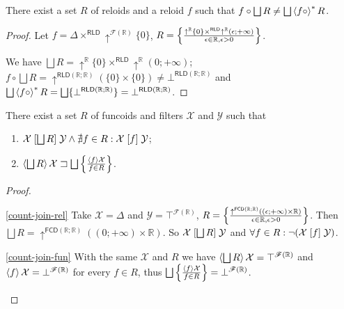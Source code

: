 \begin{example}
There exist a set $R$ of reloids and a reloid $f$ such that $f\circ\bigsqcup R\neq\bigsqcup\left\langle f\circ\right\rangle ^{\ast}R$.\end{example}
\begin{proof}
Let $f=\Delta\times^{\mathsf{RLD}}\uparrow^{\mathscr{F}(\mathbb{R})}\{0\}$,
$R=\left\{ \frac{\uparrow^{\mathbb{R}}\{0\}\times^{\mathsf{RLD}}\uparrow^{\mathbb{R}}(\epsilon;+\infty)}{\epsilon\in\mathbb{R},\epsilon>0}\right\}$.

We have $\bigsqcup R=\uparrow^{\mathbb{R}}\{0\}\times^{\mathsf{RLD}}\uparrow^{\mathbb{R}}(0;+\infty)$;
$f\circ\bigsqcup R=\uparrow^{\mathsf{RLD}(\mathbb{R};\mathbb{R})}(\{0\}\times\{0\})\ne\bot^{\mathsf{RLD}(\mathbb{R};\mathbb{R})}$
and $\bigsqcup\left\langle f\circ\right\rangle ^{\ast}R=\bigsqcup\{\bot^{\mathsf{RLD}(\mathbb{R};\mathbb{R})}\}=\bot^{\mathsf{RLD}(\mathbb{R};\mathbb{R})}$.\end{proof}
\begin{example}
There exist a set $R$ of funcoids and filters $\mathcal{X}$ and
$\mathcal{Y}$ such that
\begin{enumerate}
\item \label{count-join-rel}$\mathcal{X}\mathrel{\left[\bigsqcup R\right]}\mathcal{Y}\land\nexists f\in R:\mathcal{X}\mathrel{\left[f\right]}\mathcal{Y}$;
\item \label{count-join-fun}$\left\langle \bigsqcup R\right\rangle\mathcal{X}\sqsupset\bigsqcup\left\{ \frac{\left\langle f\right\rangle\mathcal{X}}{f\in R}\right\}$.
\end{enumerate}
\end{example}
\begin{proof}
~
\begin{widedisorder}
\item [{\ref{count-join-rel}}] Take $\mathcal{X}=\Delta$ and $\mathcal{Y}=\top^{\mathscr{F}(\mathbb{R})}$,
$R=\left\{ \frac{\uparrow^{\mathsf{FCD}(\mathbb{R};\mathbb{R})}((\epsilon;+\infty)\times\mathbb{R})}{\epsilon\in\mathbb{R},\epsilon>0}\right\}$.
Then $\bigsqcup R=\uparrow^{\mathsf{FCD}(\mathbb{R};\mathbb{R})}((0;+\infty)\times\mathbb{R})$.
So $\mathcal{X}\mathrel{\left[\bigsqcup R\right]}\mathcal{Y}$ and $\forall f\in R:\lnot(\mathcal{X}\mathrel{\left[f\right]}\mathcal{Y})$.
\item [{\ref{count-join-fun}}] With the same $\mathcal{X}$ and $R$ we
have $\left\langle \bigsqcup R\right\rangle\mathcal{X}=\top^{\mathscr{F}(\mathbb{R})}$
and $\left\langle f\right\rangle\mathcal{X}=\bot^{\mathscr{F}(\mathbb{R})}$ for every
$f\in R$, thus $\bigsqcup\left\{ \frac{\left\langle f\right\rangle\mathcal{X}}{f\in R}\right\}=\bot^{\mathscr{F}(\mathbb{R})}$.
\end{widedisorder}
\end{proof}
